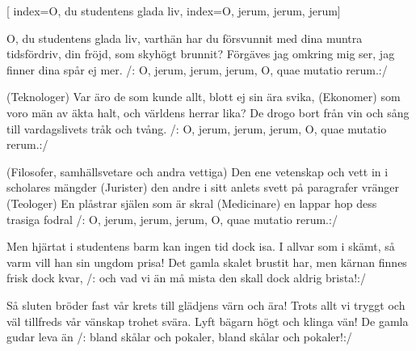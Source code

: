 [
	index={O, du studentens glada liv},
	index={O, jerum, jerum, jerum}]

\beginverse* 
O, du studentens glada liv,
varthän har du försvunnit
med dina muntra tidsfördriv,
din fröjd, som skyhögt brunnit?
Förgäves jag omkring mig ser,
jag finner dina spår ej mer.
/: O, jerum, jerum, jerum,
O, quae mutatio rerum.:/
\endverse

\beginverse* 
(Teknologer) Var äro de som kunde allt,
blott ej sin ära svika,
(Ekonomer) som voro män av äkta halt,
och världens herrar lika?
De drogo bort från vin och sång
till vardagslivets tråk och tvång.
/: O, jerum, jerum, jerum,
O, quae mutatio rerum.:/
\endverse

\beginverse* 
(Filosofer, samhällsvetare och andra vettiga) Den ene vetenskap och vett
in i scholares mängder
(Jurister) den andre i sitt anlets svett
på paragrafer vränger
(Teologer) En plåstrar själen som är skral
(Medicinare) en lappar hop dess trasiga fodral 
/: O, jerum, jerum, jerum,
O, quae mutatio rerum.:/
\endverse


\beginverse* 
Men hjärtat i studentens barm
kan ingen tid dock isa.
I allvar som i skämt, så varm
vill han sin ungdom prisa!
Det gamla skalet brustit har,
men kärnan finnes frisk dock kvar,
/: och vad vi än må mista
den skall dock aldrig brista!:/
\endverse

\beginverse* 
Så sluten bröder fast vår krets
till glädjens värn och ära!
Trots allt vi tryggt och väl tillfreds
vår vänskap trohet svära.
Lyft bägarn högt och klinga vän!
De gamla gudar leva än 
/: bland skålar och pokaler,
bland skålar och pokaler!:/ 
\endverse
\endsong


